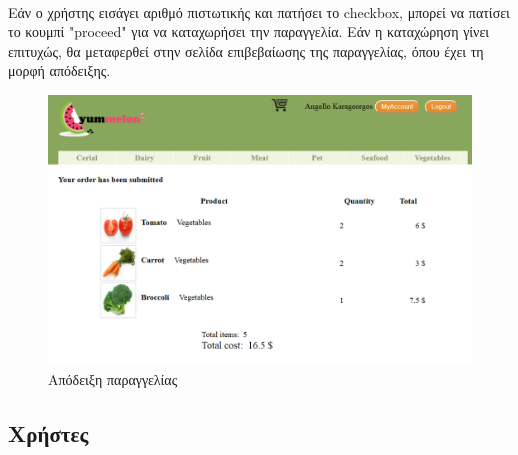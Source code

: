 \documentclass[12pt]{article}
\begin{document}
		  \paragraph{}
			Εάν ο χρήστης εισάγει αριθμό πιστωτικής και πατήσει το checkbox, μπορεί να πατίσει το κουμπί "proceed" για να καταχωρήσει την παραγγελία. Εάν η καταχώρηση γίνει επιτυχώς, θα μεταφερθεί στην σελίδα επιβεβαίωσης της παραγγελίας, όπου έχει τη μορφή απόδειξης.
			\begin{figure}[H]
				\centering
				\includegraphics[width=1\textwidth]{invoice}
				\caption{Απόδειξη παραγγελίας}
			\end{figure}

	  \subsection{Χρήστες}
\end{document}
